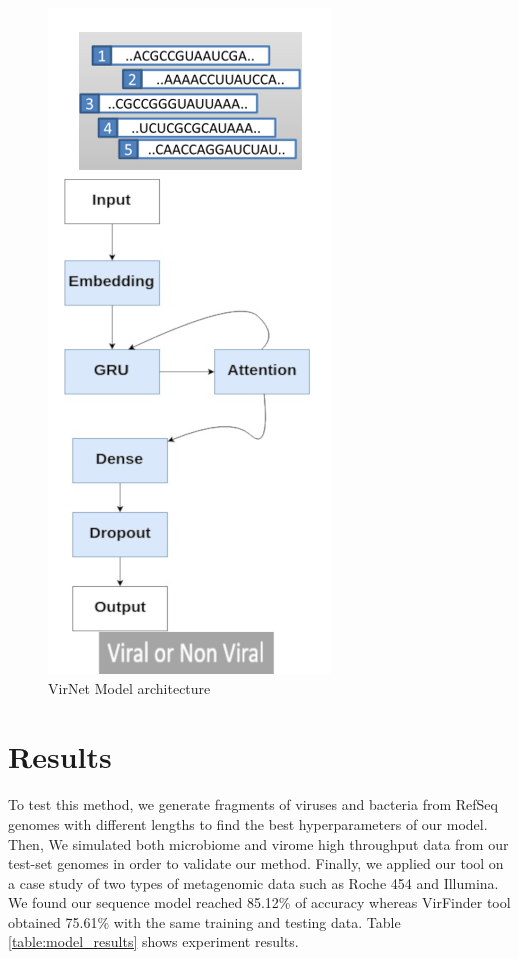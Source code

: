 \documentclass[conference]{IEEEtran}
\begin{document}
\begin{figure}
	\centering
	\includegraphics[width=0.5\columnwidth]{imgs/model_diagram.PNG}
	\caption{VirNet Model architecture}
	\label{fig:model_diagram}
\end{figure}


\section{Results}

To test this method, we generate fragments of viruses and bacteria from RefSeq genomes with different lengths to find the best hyperparameters of our model. Then, We simulated both microbiome and virome high throughput data from our test-set genomes in order to validate our method. Finally, we applied our tool on a case study of two types of metagenomic data such as Roche 454 and Illumina. We found our sequence model reached 85.12\% of accuracy whereas VirFinder tool obtained 75.61\% with the same training and testing data. Table \ref{table:model_results} shows experiment results.
\end{document}
